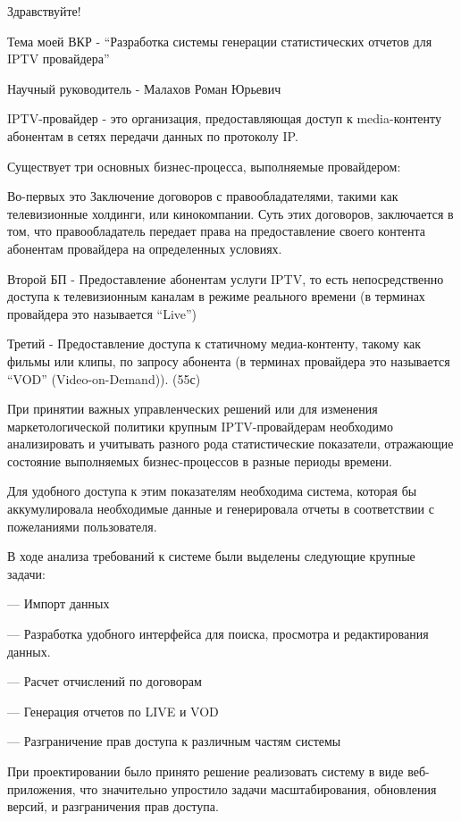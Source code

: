 \documentclass[a4paper]{article}
\begin{document}
\huge
\newpage

Здравствуйте!

Тема моей ВКР - “Разработка системы генерации статистических отчетов для IPTV провайдера”

Научный руководитель - Малахов Роман Юрьевич

\newpage
IPTV-провайдер - это организация, предоставляющая доступ к media-контенту абонентам в сетях передачи данных по протоколу IP.

Существует три основных бизнес-процесса, выполняемые провайдером:

Во-первых это Заключение договоров с правообладателями, такими как телевизионные холдинги, или кинокомпании. Суть этих договоров, заключается в том, что правообладатель передает права на предоставление своего контента абонентам провайдера на определенных условиях.

Второй БП -  Предоставление абонентам услуги IPTV, то есть непосредственно доступа к телевизионным каналам в режиме реального времени (в терминах провайдера это называется “Live”)

Третий - Предоставление доступа к статичному медиа-контенту, такому как фильмы или клипы, по запросу абонента (в терминах провайдера это называется “VOD” (Video-on-Demand)).
(55с)

\newpage

При принятии важных управленческих решений или для изменения маркетологической политики крупным IPTV-провайдерам необходимо анализировать и учитывать разного рода статистические показатели, отражающие состояние выполняемых бизнес-процессов в разные периоды времени.

Для удобного доступа к этим показателям необходима система, которая бы аккумулировала необходимые данные и генерировала отчеты в соответствии с пожеланиями пользователя.

В ходе анализа требований к системе были выделены следующие крупные задачи:

--- Импорт данных

--- Разработка удобного интерфейса для поиска, просмотра и редактирования данных.

---  Расчет отчислений по договорам

--- Генерация отчетов по LIVE и VOD

---  Разграничение прав доступа к различным частям системы

\newpage

При проектировании было принято решение реализовать систему в виде веб-приложения, 
что значительно упростило задачи масштабирования, обновления версий, и разграничения прав доступа.
\end{document}
